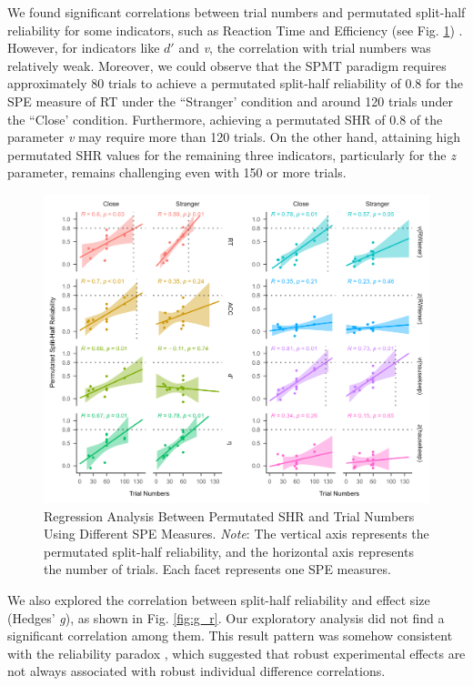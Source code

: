 \documentclass[sn-apa]{sn-jnl}%
\theoremstyle{thmstyleone}%
\theoremstyle{thmstyletwo}%
\theoremstyle{thmstylethree}%
\begin{document}
We found significant correlations between trial numbers and permutated split-half reliability for some indicators, such as Reaction Time and Efficiency (see Fig. \ref{fig:R_nTrial}) . However, for indicators like $d'$ and \textit{v}, the correlation with trial numbers was relatively weak. Moreover, we could observe that the SPMT paradigm requires approximately 80 trials to achieve a permutated split-half reliability of 0.8 for the SPE measure of RT under the ``Stranger' condition and around 120 trials under the ``Close' condition. Furthermore, achieving a permutated SHR of 0.8 of the parameter \textit{v} may require more than 120 trials. On the other hand, attaining high permutated SHR values for the remaining three indicators, particularly for the \textit{z} parameter, remains challenging even with 150 or more trials.
\begin{figure}[!h]
	\centering
	\includegraphics[width=1\textwidth]{./Figure/Fig7_r&Trial.png}
	\caption[Regression Analysis Between Permutated and Trial Numbers Using Different SPE Measures.]{Regression Analysis Between Permutated SHR and Trial Numbers Using Different SPE Measures.  \textit{Note}: The vertical axis represents the permutated split-half reliability, and the horizontal axis represents the number of trials. Each facet represents one SPE measures.
	}\label{fig:R_nTrial}
\end{figure}
\clearpage

We also explored the correlation between split-half reliability and effect size (Hedges’ \textit{g}), as shown in Fig. \ref{fig:g_r}. Our exploratory analysis did not find a significant correlation among them. This result pattern was somehow consistent with the reliability paradox \parencite{logie1996group,hedge2018reliability}, which suggested that robust experimental effects are not always associated with robust individual difference correlations.
\end{document}
